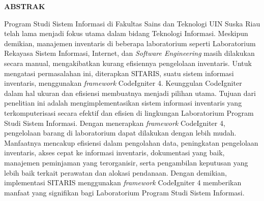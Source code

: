 %


%
\fontsize{12}{14.4}
\begin{center}\MakeUppercase{\textbf{Abstrak}}\end{center}

\noindent
\fontsize{10pt}{12pt}\selectfont
Program Studi Sistem Informasi di Fakultas Sains dan Teknologi UIN Suska Riau telah lama menjadi fokus utama dalam bidang Teknologi Informasi. Meskipun demikian, manajemen inventaris di beberapa laboratorium seperti Laboratorium Rekayasa Sistem Informasi, Internet, dan \textit{Software Engineering} masih dilakukan secara manual, mengakibatkan kurang efisiennya pengelolaan inventaris. Untuk mengatasi permasalahan ini, diterapkan SITARIS, suatu sistem informasi inventaris, menggunakan \textit{framework} CodeIgniter 4. Keunggulan CodeIgniter dalam hal ukuran dan efisiensi membuatnya menjadi pilihan utama. Tujuan dari penelitian ini adalah mengimplementasikan sistem informasi inventaris yang terkomputerisasi secara efektif dan efisien di lingkungan Laboratorium Program Studi Sistem Informasi. Dengan menerapkan \textit{framework} CodeIgniter 4, pengelolaan barang di laboratorium dapat dilakukan dengan lebih mudah. Manfaatnya mencakup efisiensi dalam pengolahan data, peningkatan pengelolaan inventaris, akses cepat ke informasi inventaris, dokumentasi yang baik, manajemen peminjaman yang terorganisir, serta pengambilan keputusan yang lebih baik terkait perawatan dan alokasi pendanaan. Dengan demikian, implementasi SITARIS menggunakan \textit{framework} CodeIgniter 4 memberikan manfaat yang signifikan bagi Laboratorium Program Studi Sistem Informasi.\\
 \\